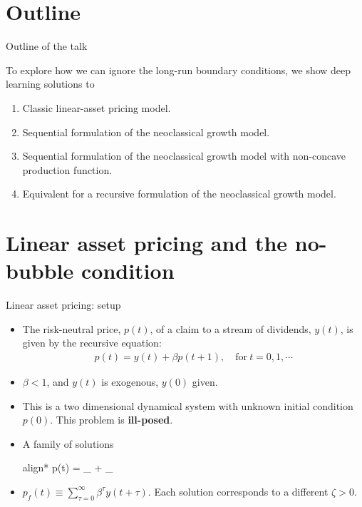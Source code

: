 \documentclass[aspectratio=169,10pt]{beamer}
\newcommand{\emphcolor}[1]{\textbf{\textcolor{emphcolorval}{#1}}}
\begin{document}
\section{Outline}

\begin{frame}{Outline of the talk}
	
	To explore how we can ignore the long-run boundary conditions, we show deep learning solutions to
	\begin{enumerate}
		\item Classic linear-asset pricing model.\vspace{0.1in}
		\item Sequential formulation of the neoclassical growth model.\vspace{0.1in}
		\item Sequential formulation of the neoclassical growth model with non-concave production function.\vspace{0.1in}
		\item Equivalent for a recursive formulation of the neoclassical growth model.\vspace{0.1in}
		
	\end{enumerate}
\end{frame}

\section{\textcolor{KahouBlack}{Linear asset pricing and the no-bubble condition}}

\begin{frame}{Linear asset pricing: setup }
	\begin{itemize}
	\item The risk-neutral price, $p(t)$, of a claim to a stream of dividends, $y(t)$, is given by
	the recursive equation:
	\begin{align*}
		p(t) = y(t) + \beta p(t+1), \quad \text{for}~ t=0,1,\cdots
	\end{align*}
	\item $\beta<1$, and $y(t)$ is exogenous, $y(0)$ given.
	\item  This is a two dimensional dynamical system with unknown initial condition  $p(0)$. This problem is \emphcolor{ill-posed}.
	\item A family of solutions
	 \begin{empheq}[box=\tcbhighmath]{align*}
	 	p(t) = _{} +  _{}
	 \end{empheq}
	 \item $p_f(t) \equiv \sum_{\tau =0}^\infty \beta^\tau y(t+\tau)$. Each solution corresponds to a different $\zeta>0$.
	\end{itemize}
\end{frame}
\end{document}
